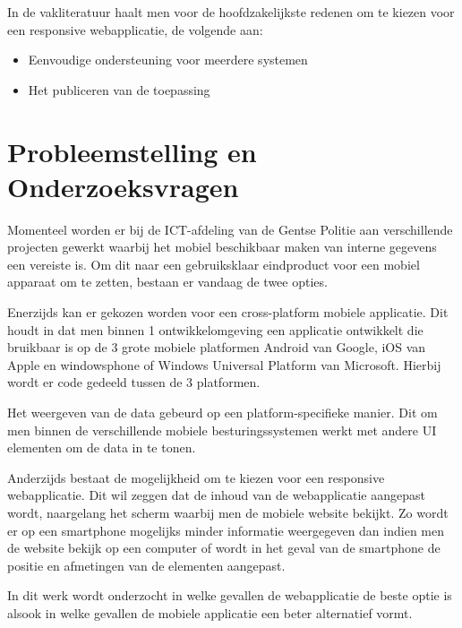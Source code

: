 In de vakliteratuur haalt men voor de hoofdzakelijkste redenen om te kiezen voor een responsive webapplicatie, de volgende aan:
\begin{itemize}
  \item{Eenvoudige ondersteuning voor meerdere systemen}
  \item{Het publiceren van de toepassing}
\end{itemize}



\section{Probleemstelling en Onderzoeksvragen}
\label{sec:onderzoeksvragen}


Momenteel worden er bij de ICT-afdeling van de Gentse Politie aan verschillende projecten gewerkt waarbij het
mobiel beschikbaar maken van interne gegevens een vereiste is.
Om dit naar een gebruiksklaar eindproduct voor een mobiel apparaat om te zetten, bestaan er vandaag de twee opties.

Enerzijds kan er gekozen worden voor een cross-platform mobiele applicatie.
Dit houdt in dat men binnen 1 ontwikkelomgeving een applicatie ontwikkelt die bruikbaar is op de
3 grote mobiele platformen Android van Google, iOS van Apple en windowsphone of
Windows Universal Platform van Microsoft.
Hierbij wordt er code gedeeld tussen de 3 platformen.

Het weergeven van de data gebeurd op een platform-specifieke manier.
Dit om men binnen de verschillende mobiele besturingssystemen werkt met andere UI elementen om de data in te tonen.

Anderzijds bestaat de mogelijkheid om te kiezen voor een responsive webapplicatie.
Dit wil zeggen dat de inhoud van de webapplicatie aangepast wordt,
 naargelang het scherm waarbij men de mobiele website bekijkt.
Zo wordt er op een smartphone mogelijks minder informatie weergegeven dan indien men de website bekijk op een computer of
wordt in het geval van de smartphone de positie en afmetingen van de elementen aangepast.

In dit werk wordt onderzocht in welke gevallen de webapplicatie de beste optie is alsook in welke gevallen de mobiele applicatie
een beter alternatief vormt.

